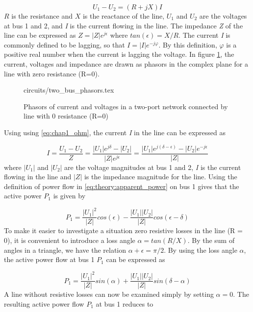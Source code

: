 \documentclass[class=book, crop=false]{standalone}
\begin{document}
\begin{equation}\label{eq:chap1_ohm}
    U_{1} - U_{2} = (R + jX)I
\end{equation}
$R$ is the resistance and $X$ is the reactance of the line, $U_{1}$ and $U_{2}$ are the voltages at bus 1 and 2, and \textit{I} is the current flowing in the line. The impedance \textit{Z} of the line can be expressed as $Z = |Z|e^{j\epsilon}$ where $tan (\epsilon) = X/R$. The current \textit{I} is commonly defined to be lagging, so that $I = |I|e^{-j\varphi}$. By this definition, $\varphi$ is a positive real number when the current is lagging the voltage. In figure \ref{fig:theory:two_bus_phasor}, the current, voltages and impedance are drawn as phasors in the complex plane for a line with zero resistance (R=0).


\begin{figure}[ht!]
    \center
    {circuits/two_bus_phasors.tex}
    \caption[size = 9]{Phasors of current and voltages in a two-port network connected by line with 0 resistance (R=0)}
    \label{fig:theory:two_bus_phasor}
\end{figure}

Using using \eqref{eq:chap1_ohm}, the current \textit{I} in the line can be expressed as

\begin{equation}\label{eq:two_port_current}
    I  = \frac{U_{1} - U_{2}}{Z}
    = \frac{|U_{1}|e^{j\delta} - |U_{2}|}{|Z|e^{j\epsilon}}
    = \frac{|U_{1}|e^{j(\delta- \epsilon)} - |U_{2}|e^{-j\epsilon}}{|Z|}
\end{equation}
where $|U_{1}|$ and $|U_{2}|$ are the voltage magnitudes at bus 1 and 2, \textit{I} is the current flowing in the line and $|Z|$ is the impedance magnitude for the line. Using the definition of power flow in \eqref{eq:theory:apparent_power} on bus 1 gives that the active power $P_{1}$ is given by

\begin{equation}\label{eq:two_port_active_power}
P_{1} = \frac{|U_{1}|^2}{|Z|}cos(\epsilon) - \frac{|U_{1}||U_{2}|}{|Z|}cos(\epsilon - \delta)
\end{equation}
To make it easier to investigate a situation zero resistive losses in the line (R = 0), it is convenient to introduce a loss angle $\alpha = tan(R/X)$. By the sum of angles in a triangle, we have the relation $\alpha + \epsilon = \pi/2$. By using the loss angle $\alpha$, the active power flow at bus 1 $P_{1}$ can be expressed as

\begin{equation}\label{eq:two_port_active_power_good}
P_{1} = \frac{|U_{1}|^2}{|Z|}sin(\alpha) + \frac{|U_{1}||U_{2}|}{|Z|}sin(\delta -\alpha)
\end{equation}
A line without resistive losses can now be examined simply by setting $\alpha = 0$. The resulting active power flow $P_{1}$ at bus 1 reduces to
\end{document}
